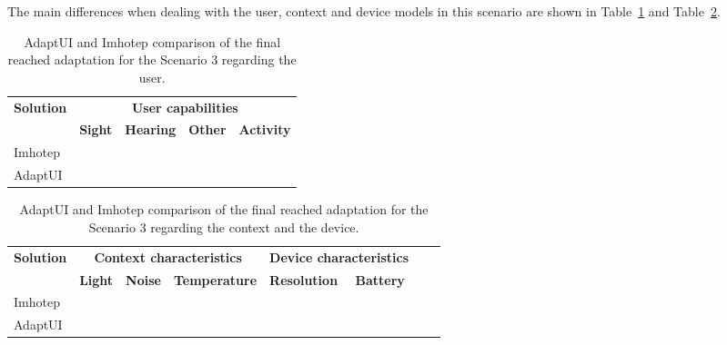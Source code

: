 The main differences when dealing with the user, context and device models in
this scenario are shown in Table~\ref{tbl:adaptui_vs_imhotep_scenario3_user} and 
Table~\ref{tbl:adaptui_vs_imhotep_scenario3_context_device}. 


\begin{table}
 \caption{AdaptUI and Imhotep comparison of the final reached adaptation for the
 Scenario 3 regarding the user.}
 \label{tbl:adaptui_vs_imhotep_scenario3_user}
 \footnotesize
 \centering
\begin{tabular}{l l l l l}
  \hline 
  \textbf{Solution}& \multicolumn{4}{c}{\textbf{User capabilities}} \\
  & \textbf{Sight} & \textbf{Hearing} & \textbf{Other} & \textbf{Activity}\\
  \hline
  Imhotep	& \checkmark & ~ & ~ & ~ \\
  AdaptUI	& \checkmark & ~ & \checkmark & \checkmark\\
  \hline
\end{tabular}
\end{table}

\begin{table}
 \caption{AdaptUI and Imhotep comparison of the final reached adaptation for the
 Scenario 3 regarding the context and the device.}
 \label{tbl:adaptui_vs_imhotep_scenario3_context_device}
 \footnotesize
 \centering
\begin{tabular}{l l l l l l l l}
  \hline 
  \textbf{Solution} &  \multicolumn{3}{c}{\textbf{Context characteristics}} & 
  \multicolumn{2}{c}{\textbf{Device characteristics}}\\
  & \textbf{Light} & \textbf{Noise} & \textbf{Temperature} & 
  \textbf{Resolution} & \textbf{Battery} \\
  \hline
  Imhotep	& ~ & ~ & ~ & \checkmark & ~\\
  AdaptUI	& ~ & \checkmark & ~ & \checkmark & \checkmark \\
  \hline
\end{tabular}
\end{table}